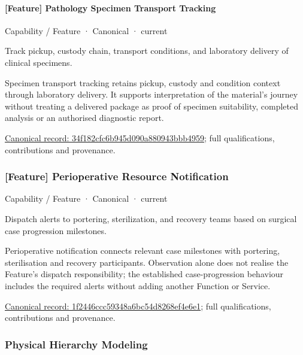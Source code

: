 \paragraph{[Feature] Pathology Specimen Transport Tracking}

\label{element:34f182cfc6b945d090a880943bbb4959}
{\small Capability / Feature · Canonical · current}\par

Track pickup, custody chain, transport conditions, and laboratory delivery of clinical specimens.



Specimen transport tracking retains pickup, custody and condition context through laboratory delivery. It supports interpretation of the material's journey without treating a delivered package as proof of specimen suitability, completed analysis or an authorised diagnostic report.


{\footnotesize \href{../../../../continuum/strategy/capability/feature/34f182cfc6b945d090a880943bbb4959.md}{Canonical record: 34f182cfc6b945d090a880943bbb4959}; full qualifications, contributions and provenance.}\par
\subsubsection{[Feature] Perioperative Resource Notification}

\label{element:1f2446ccc59348a6bc54d8268ef4e6e1}
{\small Capability / Feature · Canonical · current}\par

Dispatch alerts to portering, sterilization, and recovery teams based on surgical case progression milestones.



Perioperative notification connects relevant case milestones with portering, sterilisation and recovery participants. Observation alone does not realise the Feature's dispatch responsibility; the established case-progression behaviour includes the required alerts without adding another Function or Service.


{\footnotesize \href{../../../../continuum/strategy/capability/feature/1f2446ccc59348a6bc54d8268ef4e6e1.md}{Canonical record: 1f2446ccc59348a6bc54d8268ef4e6e1}; full qualifications, contributions and provenance.}\par
\subsubsection{Physical Hierarchy Modeling}

